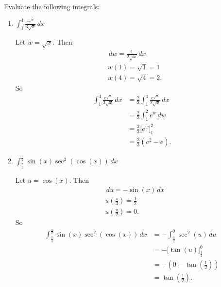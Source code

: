\documentclass[nooutcomes, handout]{ximera}
\renewcommand{\d}{\,d}
\newcommand{\eval}[1]{\bigg[ #1 \bigg]}
\begin{document}
\begin{problem}
Evaluate the following integrals:

	\begin{enumerate}
	
	\item  $\int_1^4 \frac{e^{\sqrt{x}}}{3\sqrt{x}} \d x$
		\begin{freeResponse}
		Let $w=\sqrt{x}$.  Then
			\begin{align*}
			&\d w = \frac{1}{2 \sqrt{x}} \d x  \\
			&w(1) = \sqrt{1} = 1  \\
			&w(4) = \sqrt{4} = 2.
			\end{align*}
		So
			\begin{align*}
			\int_1^4 \frac{e^{\sqrt{x}}}{3\sqrt{x}} \d x &= \frac{2}{3} \int_1^4 \frac{e^{\sqrt{x}}}{2\sqrt{x}} \d x  \\
			&= \frac{2}{3} \int_1^2 e^w \d w  \\
			&= \frac{2}{3} \eval{e^w}_1^2  \\
			&= \frac{2}{3} (e^2 - e).
			\end{align*}
		\end{freeResponse}
		
		
		
	\item  $\int_{\frac{\pi}{3}}^{\frac{\pi}{2}} \sin(x) \sec^2(\cos(x)) \d x$
		\begin{freeResponse}
		Let $u=\cos(x)$.  Then
			\begin{align*}
			&\d u = -\sin(x) \d x  \\
			&u\left( \frac{\pi}{3} \right) = \frac{1}{2}  \\
			&u\left( \frac{\pi}{2} \right) = 0.
			\end{align*}
		So
			\begin{align*}
			\int_{\frac{\pi}{3}}^{\frac{\pi}{2}} \sin(x) \sec^2(\cos(x)) \d x &= - \int_{\frac{1}{2}}^0 \sec^2(u) \d u   \\
			&= - \eval{\tan(u)}_{\frac{1}{2}}^0  \\
			&=  -\left( 0 - \tan\left( \frac{1}{2} \right) \right)  \\
			&= \tan \left( \frac{1}{2} \right).
			\end{align*}
		\end{freeResponse}
		
		
		
	\end{enumerate}
			
			
	
\end{problem}
\end{document}
